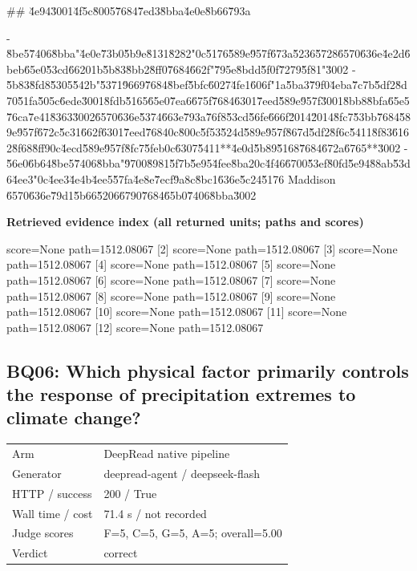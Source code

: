 \documentclass[10pt]{article}
\begin{document}
\begin{AnswerText}
## \u4e94\u3001\u4f5c\u8005\u7684\u7ed3\u8bba\u4e0e\u8b66\u793a

- \u8be5\u7406\u8bba"\u4e0e\u73b0\u5b9e\u8131\u8282"\uff0c\u5176\u589e\u957f\u673a\u5236\u5728\u6570\u636e\u4e2d\u6beb\u65e0\u53cd\u6620\uff1b\u5b83\u8bb2\u8ff0\u7684\u662f"\u795e\u8bdd\u5f0f\u7279\u5f81"\u3002
- \u5b83\u8fd8\u5305\u542b"\u5371\u9669\u7684\u8bef\u5bfc\u6027\u4fe1\u606f"\uff1a\u5ba3\u79f0\u4eba\u7c7b\u5df2\u8d70\u51fa\u505c\u6ede\u3001\u8fdb\u5165\u65e0\u7ea6\u675f\u7684\u6301\u7eed\u589e\u957f\u3001\u8bb8\u8bfa\u65e5\u76ca\u7e41\u8363\u3002\u6570\u636e\u5374\u663e\u793a\u76f8\u53cd\u56fe\u666f\u2014\u2014\u8fc7\u53bb\u7684\u589e\u957f\u672c\u5c31\u662f\u6301\u7eed\u7684\uff0c\u800c\u5f53\u524d\u589e\u957f\u867d\u5df2\u8f6c\u5411\u8f83\u6162\u8f68\u8ff9\uff0c\u4ecd\u589e\u957f\u8fc7\u5feb\uff0c\u6307\u5411**\u4e0d\u5b89\u5168\u7684\u672a\u6765**\u3002
- \u56e0\u6b64\u8be5\u7406\u8bba"\u9700\u8981\u5f7b\u5e95\u4fee\u8ba2\uff0c\u4f46\u6700\u53ef\u80fd\u5e94\u88ab\u53d6\u4ee3"\uff0c\u4ee3\u4e4b\u4ee5\u57fa\u4e8e\u7ecf\u9a8c\u8bc1\u636e\u5c24\u5176 Maddison \u6570\u636e\u79d1\u5b66\u5206\u6790\u7684\u65b0\u7406\u8bba\u3002
\end{AnswerText}

\textbf{Retrieved evidence index (all returned units; paths and scores) }
\begin{EvidenceText}
[1] score=None path=1512.08067
[2] score=None path=1512.08067
[3] score=None path=1512.08067
[4] score=None path=1512.08067
[5] score=None path=1512.08067
[6] score=None path=1512.08067
[7] score=None path=1512.08067
[8] score=None path=1512.08067
[9] score=None path=1512.08067
[10] score=None path=1512.08067
[11] score=None path=1512.08067
[12] score=None path=1512.08067
\end{EvidenceText}
\subsection{BQ06: Which physical factor primarily controls the response of precipitation extremes to climate change?}
\begin{tabular}{@{}ll@{}}
Arm & DeepRead native pipeline\\
Generator & deepread-agent / deepseek-flash\\
HTTP / success & 200 / True\\
Wall time / cost & 71.4 s / not recorded\\
Judge scores & F=5, C=5, G=5, A=5; overall=5.00\\
Verdict & correct\\
\end{tabular}
\end{document}

